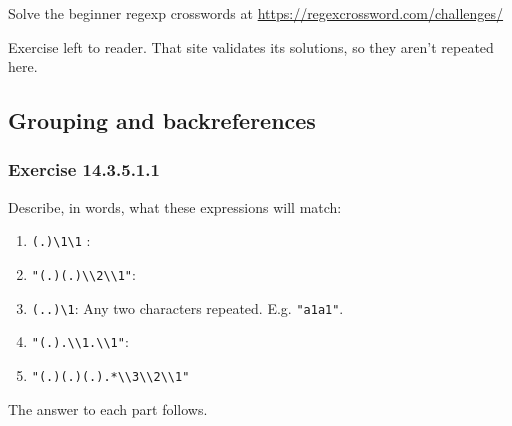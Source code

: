 \documentclass[]{book}
\providecommand{\tightlist}{%
  \setlength{\itemsep}{0pt}\setlength{\parskip}{0pt}}
\theoremstyle{plain}
\theoremstyle{remark}
\begin{document}
Solve the beginner regexp crosswords at
\url{https://regexcrossword.com/challenges/}

Exercise left to reader. That site validates its solutions, so they
aren't repeated here.

\hypertarget{grouping-and-backreferences}{%
\subsection{Grouping and
backreferences}\label{grouping-and-backreferences}}

\hypertarget{exercise-14.3.5.1.1}{%
\subsubsection*{\texorpdfstring{Exercise
{14.3.5.1.1}}{Exercise 14.3.5.1.1}}\label{exercise-14.3.5.1.1}}

Describe, in words, what these expressions will match:

\begin{enumerate}
\def\labelenumi{\arabic{enumi}.}
\tightlist
\item
  \texttt{(.)\textbackslash{}1\textbackslash{}1} :
\item
  \texttt{"(.)(.)\textbackslash{}\textbackslash{}2\textbackslash{}\textbackslash{}1"}:
\item
  \texttt{(..)\textbackslash{}1}: Any two characters repeated. E.g.
  \texttt{"a1a1"}.
\item
  \texttt{"(.).\textbackslash{}\textbackslash{}1.\textbackslash{}\textbackslash{}1"}:
\item
  \texttt{"(.)(.)(.).*\textbackslash{}\textbackslash{}3\textbackslash{}\textbackslash{}2\textbackslash{}\textbackslash{}1"}
\end{enumerate}

The answer to each part follows.
\end{document}
